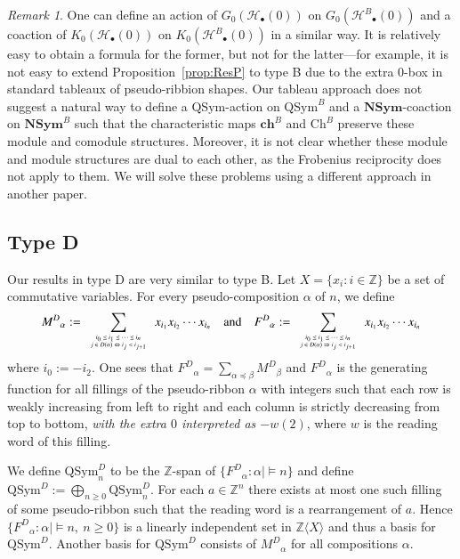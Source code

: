 \documentclass{amsart}
\newtheorem*{Young's Rule}{Young's Rule}
\theoremstyle{definition}
\theoremstyle{remark}
\newtheorem{remark}[theorem]{Remark}
\numberwithin{equation}{section}
\begin{document}
\begin{remark}
One can define an action of $G_0({\mathcal{H}}_\bullet(0))$ on $G_0({\mathcal{H}^B}_\bullet(0))$ and a coaction of $K_0({\mathcal{H}}_\bullet(0))$ on $K_0({\mathcal{H}^B}_\bullet(0))$ in a similar way. It is relatively easy to obtain a formula for the former, but not for the latter---for example, it is not easy to extend Proposition~\ref{prop:ResP} to type B due to the extra 0-box in standard tableaux of pseudo-ribbion shapes. Our tableau approach does not suggest a natural way to define a ${\mathrm{QSym}}$-action on ${\mathrm{QSym}}^B$ and a ${\mathbf{NSym}}$-coaction on ${\mathbf{NSym}}^B$ such that the characteristic maps $\mathbf{ch}^B$ and $\mathrm{Ch}^B$ preserve these module and comodule structures. Moreover, it is not clear whether these module and module structures are dual to each other, as the Frobenius reciprocity does not apply to them. We will solve these problems using a different approach in another paper.
\end{remark}

\subsection{Type D}
Our results in type D are very similar to type B. Let $X=\{x_i:i\in\mathbb Z\}$ be a set of commutative variables. For every pseudo-composition $\alpha$ of $n$, we define 
\[ {M^D}_\alpha:= \sum_{\tiny\begin{array}{c} i_0\leq i_1\leq\cdots\leq i_n \\ j\in D(\alpha)\Leftrightarrow i_j<i_{j+1}\end{array}} x_{i_1}x_{i_2}\cdots x_{i_n}
{\quad\text{and}\quad} {F^D}_\alpha:=\sum_{\tiny\begin{array}{c} i_0\leq i_1\leq\cdots\leq i_n \\ j\in D(\alpha)\Rightarrow i_j<i_{j+1}\end{array}} x_{i_1}x_{i_2}\cdots x_{i_n}  \]
where $i_0:=-i_2$. 
One sees that ${F^D}_\alpha=\sum_{\alpha{\operatorname{\preccurlyeq}}\beta}{M^D}_\beta$ and ${F^D}_\alpha$ is the generating function for all fillings of the pseudo-ribbon $\alpha$ with integers such that each row is weakly increasing from left to right and each column is strictly decreasing from top to bottom, \emph{with the extra $0$ interpreted as $-w(2)$}, where $w$ is the reading word of this filling. 

We define ${\mathrm{QSym}}^D_n$ to be the ${{\mathbb Z}}$-span of $\{{F^D}_\alpha:\alpha\mid\models n\}$ and define ${\mathrm{QSym}}^D:=\bigoplus_{n\geq0}{\mathrm{QSym}}^D_n$. For each $a\in {{\mathbb Z}}^n$ there exists at most one such filling of some pseudo-ribbon such that the reading word is a rearrangement of $a$. Hence $\{{F^D}_\alpha:\alpha\mid\models n,\ n\ge0\}$ is a linearly independent set in ${{\mathbb Z}}\langle X\rangle$ and thus a basis for ${\mathrm{QSym}}^D$. Another basis for ${\mathrm{QSym}}^D$ consists of ${M^D}_\alpha$ for all compositions $\alpha$.
\end{document}
